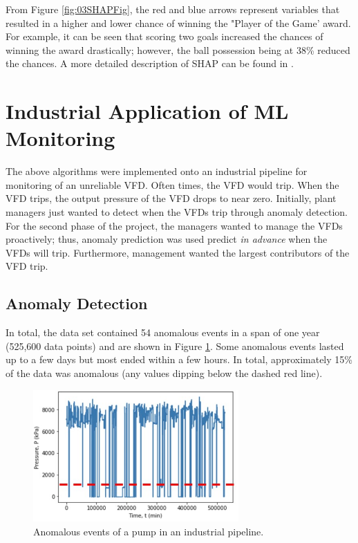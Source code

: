 From Figure \ref{fig:03SHAPFig}, the red and blue arrows represent variables that resulted in a higher and lower chance of winning the "Player of the Game' award. For example, it can be seen that scoring two goals increased the chances of winning the award drastically; however, the ball possession being at 38\% reduced the chances. A more detailed description of SHAP can be found in \cite{SHAP}.




\section{Industrial Application of ML Monitoring}
The above algorithms were implemented onto an industrial pipeline for monitoring of an unreliable VFD.  Often times, the VFD would trip. When the VFD trips, the output pressure of the VFD drops to near zero. Initially, plant managers just wanted to detect when the VFDs trip through anomaly detection.  For the second phase of the project, the managers wanted to manage the VFDs proactively; thus, anomaly prediction was used predict \textit{in advance} when the VFDs will trip. Furthermore, management wanted the largest contributors of the VFD trip.  

\subsection{Anomaly Detection}
In total, the data set contained 54 anomalous events in a span of one year (525,600 data points) and are shown in Figure \ref{fig:03anomalous_events}. Some anomalous events lasted up to a few days but most ended within a few hours. In total, approximately 15\% of the data was anomalous (any values dipping below the dashed red line). 

\begin{figure}[H]
    \centering
    \includegraphics[width=0.7\textwidth]{images/ch3/anomalous_events.jpg}
    \caption{Anomalous events of a pump in an industrial pipeline.}
    \label{fig:03anomalous_events}
\end{figure}

